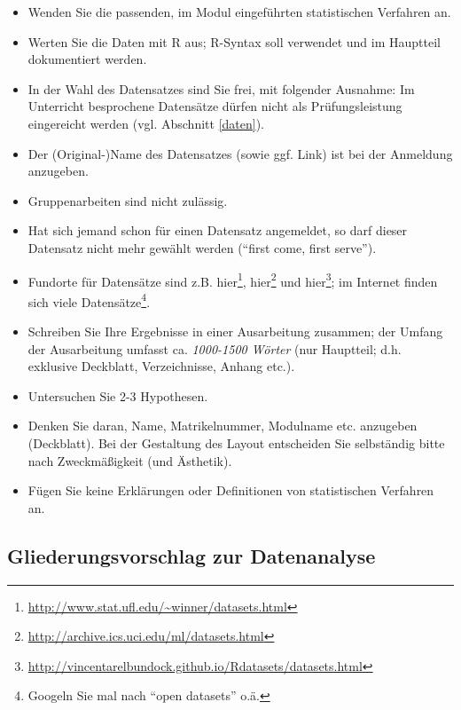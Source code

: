 \documentclass[12pt,ngerman,]{book}
\let\rmarkdownfootnote\footnote%
\def\footnote{\protect\rmarkdownfootnote}
\renewcommand{\href}[2]{#2\footnote{\url{#1}}}
\theoremstyle{definition}
\theoremstyle{definition}
\theoremstyle{remark}
\begin{document}
\begin{itemize}
\item
  Wenden Sie die passenden, im Modul eingeführten statistischen
  Verfahren an.
\item
  Werten Sie die Daten mit R aus; R-Syntax soll verwendet und im
  Hauptteil dokumentiert werden.
\item
  In der Wahl des Datensatzes sind Sie frei, mit folgender Ausnahme: Im
  Unterricht besprochene Datensätze dürfen nicht als Prüfungsleistung
  eingereicht werden (vgl. Abschnitt \ref{daten}).
\item
  Der (Original-)Name des Datensatzes (sowie ggf. Link) ist bei der
  Anmeldung anzugeben.
\item
  Gruppenarbeiten sind nicht zulässig.
\item
  Hat sich jemand schon für einen Datensatz angemeldet, so darf dieser
  Datensatz nicht mehr gewählt werden (``first come, first serve'').
\item
  Fundorte für Datensätze sind z.B.
  \href{http://www.stat.ufl.edu/~winner/datasets.html}{hier},
  \href{http://archive.ics.uci.edu/ml/datasets.html}{hier} und
  \href{http://vincentarelbundock.github.io/Rdatasets/datasets.html}{hier};
  im Internet finden sich viele Datensätze\footnote{Googeln Sie mal nach
    ``open datasets'' o.ä.}.
\item
  Schreiben Sie Ihre Ergebnisse in einer Ausarbeitung zusammen; der
  Umfang der Ausarbeitung umfasst ca. \emph{1000-1500 Wörter} (nur
  Hauptteil; d.h. exklusive Deckblatt, Verzeichnisse, Anhang etc.).
\item
  Untersuchen Sie 2-3 Hypothesen.
\item
  Denken Sie daran, Name, Matrikelnummer, Modulname etc. anzugeben
  (Deckblatt). Bei der Gestaltung des Layout entscheiden Sie selbständig
  bitte nach Zweckmäßigkeit (und Ästhetik).
\item
  Fügen Sie keine Erklärungen oder Definitionen von statistischen
  Verfahren an.
\end{itemize}

\subsection{Gliederungsvorschlag zur
Datenanalyse}\label{gliederungsvorschlag-zur-datenanalyse}
\end{document}

